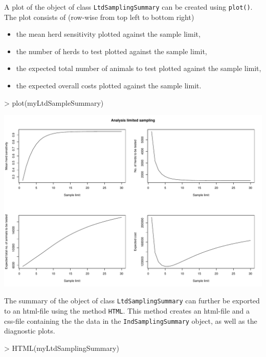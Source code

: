 \documentclass[nojss]{jss}
\begin{document}
 A plot of the object 
of class \texttt{LtdSamplingSummary} can be created using 
\texttt{plot()}.  The 
plot consists of (row-wise from top left to bottom right) 

\begin{itemize}
\item the mean herd sensitivity plotted against the sample limit,
\item the number of herds to test plotted against the sample limit,
\item the expected total number of animals to test plotted against the sample limit,
\item the expected overall costs plotted against the sample limit.
\end{itemize}

\begin{Schunk}
\begin{Sinput}
> plot(myLtdSampleSummary)  
\end{Sinput}
\end{Schunk}
\includegraphics{FFD-intro-007}

The summary of the object of class \texttt{LtdSamplingSummary} can 
further be exported to an html-file using the method \texttt{HTML}. 
 This method creates 
an html-file and a css-file containing the the data in the 
\texttt{IndSamplingSummary} object, as well as the diagnostic plots. 

\begin{Schunk}
\begin{Sinput}
> HTML(myLtdSamplingSummary)
\end{Sinput}
\end{Schunk} 
\end{document}
